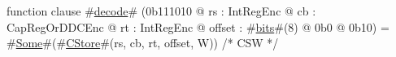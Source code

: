function clause #\hyperref[zdecode]{decode}# (0b111010 @ rs : IntRegEnc @ cb : CapRegOrDDCEnc @ rt : IntRegEnc @ offset : #\hyperref[zbits]{bits}#(8) @ 0b0 @ 0b10) = #\hyperref[zSome]{Some}#(#\hyperref[zCStore]{CStore}#(rs, cb, rt, offset, W)) /* CSW */
